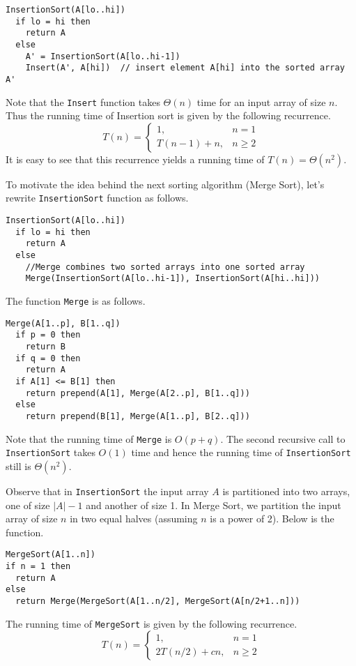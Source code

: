 \documentclass[11pt,twoside]{article}
\begin{document}
\begin{verbatim}
InsertionSort(A[lo..hi])
  if lo = hi then
    return A
  else
    A' = InsertionSort(A[lo..hi-1])
    Insert(A', A[hi])  // insert element A[hi] into the sorted array A'   
\end{verbatim}
Note that the \texttt{Insert} function takes $\Theta(n)$ time for an
input array of size $n$. Thus the running time of Insertion sort is
given by the following recurrence.
\[
T(n) = \left\{ \begin{array}{ll}
      1, &  n=1 \\
      T(n-1) + n, &  n \geq 2 
      \end{array} \right.
\]
It is easy to see that this recurrence yields a running time of
$T(n)=\Theta(n^2)$.

To motivate the idea behind the next sorting algorithm (Merge Sort), let's rewrite
\texttt{InsertionSort} function as follows.  
\begin{verbatim}
InsertionSort(A[lo..hi])
  if lo = hi then
    return A
  else
    //Merge combines two sorted arrays into one sorted array   
    Merge(InsertionSort(A[lo..hi-1]), InsertionSort(A[hi..hi]))  
\end{verbatim}
The function \texttt{Merge} is as follows.
\begin{verbatim}
Merge(A[1..p], B[1..q])
  if p = 0 then 
    return B
  if q = 0 then
    return A
  if A[1] <= B[1] then
    return prepend(A[1], Merge(A[2..p], B[1..q])) 
  else
    return prepend(B[1], Merge(A[1..p], B[2..q]))
\end{verbatim}
Note that the running time of \texttt{Merge} is $O(p+q)$. 
The second recursive call to \texttt{InsertionSort} takes
$O(1)$ time and hence the running time of \texttt{InsertionSort} still is
$\Theta(n^2)$. 

Observe that in \texttt{InsertionSort} the input array $A$ is partitioned
into two arrays, one of size $|A|-1$ and another of size 1. In Merge
Sort, we partition the input array of size $n$ in two equal halves (assuming $n$ is
a power of 2). Below is the function.

\begin{verbatim}
MergeSort(A[1..n])
if n = 1 then
  return A
else
  return Merge(MergeSort(A[1..n/2], MergeSort(A[n/2+1..n]))
\end{verbatim}
The running time of \texttt{MergeSort} is given by the following
recurrence.
\[
T(n) = \left\{ \begin{array}{ll}
      1, & n=1 \\
     2T(n/2) + cn, &  n \geq 2 
            \end{array} \right.
\]
\end{document}
